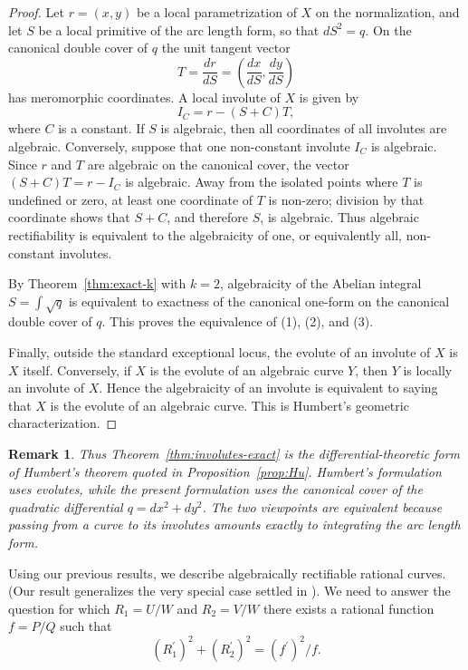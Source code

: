 \documentclass[reqno]{amsart}
\newtheorem{remark}{Remark}
\theoremstyle{definition}
\theoremstyle{remark}
\theoremstyle{definition}
\theoremstyle{definition}
\theoremstyle{definition}
\begin{document}
\begin{proof}
Let $r=(x,y)$ be a local parametrization of $X$ on the normalization,
and let $S$ be a local primitive of the arc length form, so that
$dS^2=q$. On the canonical double cover of $q$ the unit tangent vector
\[
T=\frac{dr}{dS}
 =
\left(\frac{dx}{dS},\frac{dy}{dS}\right)
\]
has meromorphic coordinates. A local involute of $X$ is given by
\[
I_C=r-(S+C)T,
\]
where $C$ is a constant. If $S$ is algebraic, then all coordinates of
all involutes are algebraic. Conversely, suppose that one non-constant
involute $I_C$ is algebraic. Since $r$ and $T$ are algebraic on the
canonical cover, the vector $(S+C)T=r-I_C$ is algebraic. Away from the
isolated points where $T$ is undefined or zero, at least one coordinate
of $T$ is non-zero; division by that coordinate shows that $S+C$, and
therefore $S$, is algebraic. Thus algebraic rectifiability is equivalent
to the algebraicity of one, or equivalently all, non-constant involutes.

By Theorem~\ref{thm:exact-k} with $k=2$, algebraicity of the Abelian
integral $S=\int\sqrt{q}$ is equivalent to exactness of the canonical
one-form on the canonical double cover of $q$. This proves the
equivalence of (1), (2), and (3).

Finally, outside the standard exceptional locus, the evolute of an
involute of $X$ is $X$ itself. Conversely, if $X$ is the evolute of an
algebraic curve $Y$, then $Y$ is locally an involute of $X$. Hence the
algebraicity of an involute is equivalent to saying that $X$ is the
evolute of an algebraic curve. This is Humbert's geometric
characterization.
\end{proof}

\begin{remark}{\rm
Thus Theorem~\ref{thm:involutes-exact} is the differential-theoretic
form of Humbert's theorem quoted in Proposition~\ref{prop:Hu}. Humbert's
formulation uses evolutes, while the present formulation uses the
canonical cover of the quadratic differential $q=dx^2+dy^2$. The two
viewpoints are equivalent because passing from a curve to its involutes
amounts exactly to integrating the arc length form.}
\end{remark}

\medskip
Using our previous results, we describe algebraically rectifiable rational curves. (Our result generalizes the very special case settled in \cite{SaFa}).  We need to answer the question for which $R_1=U/W$ and $R_2=V/W$ there exists a rational function $f=P/Q$ such that
$$(R_1^\prime)^2+(R_2^\prime)^2=(f^\prime)^2/f.$$
\end{document}
